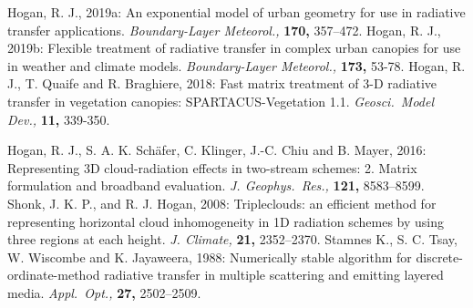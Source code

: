 \documentclass[a4,oneside]{article}
\begin{document}
\begin{thebibliography}{00}
%
Hogan, R. J., 2019a: An
exponential model of urban geometry for use in radiative transfer
applications. \textit{Boundary-Layer Meteorol.,} \textbf{170,}
357--472.
%
Hogan, R. J., 2019b: Flexible
treatment of radiative transfer in complex urban canopies for use in
weather and climate models. \textit{Boundary-Layer Meteorol.,}
\textbf{173,} 53-78.
%
Hogan, R. J., T. Quaife
and R. Braghiere, 2018: Fast matrix treatment of 3-D radiative
transfer in vegetation canopies: SPARTACUS-Vegetation
1.1. \textit{Geosci.\ Model Dev.,} \textbf{11,} 339-350.
%

%
%
Hogan, R. J.,
S. A. K. Sch\"afer, C. Klinger, J.-C. Chiu and B. Mayer, 2016:
Representing 3D cloud-radiation effects in two-stream schemes:
2. Matrix formulation and broadband
evaluation. \textit{J. Geophys.\ Res.,} \textbf{121,} 8583--8599.
%
%
Shonk, J. K. P., and
R. J. Hogan, 2008: Tripleclouds: an efficient method for representing
horizontal cloud inhomogeneity in 1D radiation schemes by using three
regions at each height. \textit{J. Climate,} \textbf{21,} 2352--2370.
%
Stamnes K.,
S. C. Tsay, W. Wiscombe and K. Jayaweera, 1988: Numerically stable
algorithm for discrete-ordinate-method radiative transfer in multiple
scattering and emitting layered media. \textit{Appl.\ Opt.,}
\textbf{27,} 2502--2509.
\end{thebibliography}
\end{document}
